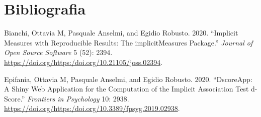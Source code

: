 \documentclass[
]{article}
\newlength{\cslhangindent}
\newlength{\cslentryspacingunit} %
\newenvironment{CSLReferences}[2] %
 {%
  \setlength{\parindent}{0pt}
  \ifodd #1
  \let\oldpar\par
  \def\par{\hangindent=\cslhangindent\oldpar}
  \fi
  \setlength{\parskip}{#2\cslentryspacingunit}
 }%
 {}
\begin{document}
\clearpage

\hypertarget{bibliografia}{%
\section*{Bibliografia}\label{bibliografia}}

\hypertarget{refs}{}
\begin{CSLReferences}{1}{0}
\leavevmode{}%
Bianchi, Ottavia M, Pasquale Anselmi, and Egidio Robusto. 2020.
{``Implicit Measures with Reproducible Results: The implicitMeasures
Package.''} \emph{Journal of Open Source Software} 5 (52): 2394.
\url{https://doi.org/https:/doi.org/10.21105/joss.02394}.

\leavevmode{}%
Epifania, Ottavia M, Pasquale Anselmi, and Egidio Robusto. 2020.
{``DscoreApp: A Shiny Web Application for the Computation of the
Implicit Association Test d-Score.''} \emph{Frontiers in Psychology} 10:
2938. \url{https://doi.org/https:/doi.org/10.3389/fpsyg.2019.02938}.

\end{CSLReferences}
\end{document}

